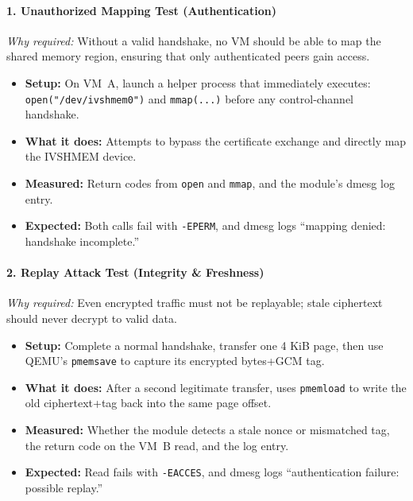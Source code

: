 \documentclass[conference]{IEEEtran}
\begin{document}
\paragraph{1. Unauthorized Mapping Test (Authentication)}  
\emph{Why required:} Without a valid handshake, no VM should be able to map the shared memory region, ensuring that only authenticated peers gain access.  
\begin{itemize}
  \item \textbf{Setup:} On VM~A, launch a helper process that immediately executes:
    \texttt{open("/dev/ivshmem0")} and \texttt{mmap(...)} before any control‐channel handshake.
  \item \textbf{What it does:} Attempts to bypass the certificate exchange and directly map the IVSHMEM device.
  \item \textbf{Measured:} Return codes from \texttt{open} and \texttt{mmap}, and the module’s dmesg log entry.
  \item \textbf{Expected:} Both calls fail with \texttt{-EPERM}, and dmesg logs “mapping denied: handshake incomplete.”
\end{itemize}

\paragraph{2. Replay Attack Test (Integrity \& Freshness)}  
\emph{Why required:} Even encrypted traffic must not be replayable; stale ciphertext should never decrypt to valid data.  
\begin{itemize}
  \item \textbf{Setup:} Complete a normal handshake, transfer one 4 KiB page, then use QEMU’s \texttt{pmemsave} to capture its encrypted bytes+GCM tag.
  \item \textbf{What it does:} After a second legitimate transfer, uses \texttt{pmemload} to write the old ciphertext+tag back into the same page offset.
  \item \textbf{Measured:} Whether the module detects a stale nonce or mismatched tag, the return code on the VM~B read, and the log entry.
  \item \textbf{Expected:} Read fails with \texttt{-EACCES}, and dmesg logs “authentication failure: possible replay.”
\end{itemize}
\end{document}
